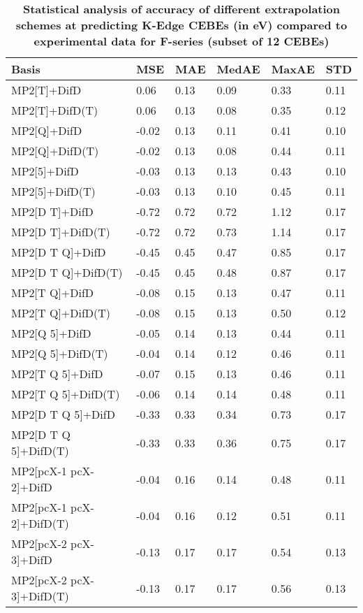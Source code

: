 \begin{table}
  \caption{\textbf{Statistical analysis of accuracy of different extrapolation schemes at predicting K-Edge CEBEs (in eV) compared to experimental data for F-series (subset of 12 CEBEs)}}
  \begin{tabular}{l l l l l l }
    \toprule
    \textbf{Basis} & \textbf{MSE} & \textbf{MAE} & \textbf{MedAE} & \textbf{MaxAE} & \textbf{STD} \\ 
    \midrule
    MP2[T]+DifD & 0.06 & 0.13 & 0.09 & 0.33 & 0.11 \\ 
    MP2[T]+DifD(T) & 0.06 & 0.13 & 0.08 & 0.35 & 0.12 \\ 
    MP2[Q]+DifD & -0.02 & 0.13 & 0.11 & 0.41 & 0.10 \\ 
    MP2[Q]+DifD(T) & -0.02 & 0.13 & 0.08 & 0.44 & 0.11 \\ 
    MP2[5]+DifD & -0.03 & 0.13 & 0.13 & 0.43 & 0.10 \\ 
    MP2[5]+DifD(T) & -0.03 & 0.13 & 0.10 & 0.45 & 0.11 \\ 
    MP2[D T]+DifD & -0.72 & 0.72 & 0.72 & 1.12 & 0.17 \\ 
    MP2[D T]+DifD(T) & -0.72 & 0.72 & 0.73 & 1.14 & 0.17 \\ 
    MP2[D T Q]+DifD & -0.45 & 0.45 & 0.47 & 0.85 & 0.17 \\ 
    MP2[D T Q]+DifD(T) & -0.45 & 0.45 & 0.48 & 0.87 & 0.17 \\ 
    MP2[T Q]+DifD & -0.08 & 0.15 & 0.13 & 0.47 & 0.11 \\ 
    MP2[T Q]+DifD(T) & -0.08 & 0.15 & 0.13 & 0.50 & 0.12 \\ 
    MP2[Q 5]+DifD & -0.05 & 0.14 & 0.13 & 0.44 & 0.11 \\ 
    MP2[Q 5]+DifD(T) & -0.04 & 0.14 & 0.12 & 0.46 & 0.11 \\ 
    MP2[T Q 5]+DifD & -0.07 & 0.15 & 0.13 & 0.46 & 0.11 \\ 
    MP2[T Q 5]+DifD(T) & -0.06 & 0.14 & 0.14 & 0.48 & 0.11 \\ 
    MP2[D T Q 5]+DifD & -0.33 & 0.33 & 0.34 & 0.73 & 0.17 \\ 
    MP2[D T Q 5]+DifD(T) & -0.33 & 0.33 & 0.36 & 0.75 & 0.17 \\ 
    MP2[pcX-1 pcX-2]+DifD & -0.04 & 0.16 & 0.14 & 0.48 & 0.11 \\ 
    MP2[pcX-1 pcX-2]+DifD(T) & -0.04 & 0.16 & 0.12 & 0.51 & 0.11 \\ 
    MP2[pcX-2 pcX-3]+DifD & -0.13 & 0.17 & 0.17 & 0.54 & 0.13 \\ 
    MP2[pcX-2 pcX-3]+DifD(T) & -0.13 & 0.17 & 0.17 & 0.56 & 0.13 \\ 

\end{tabular}
\end{table}
